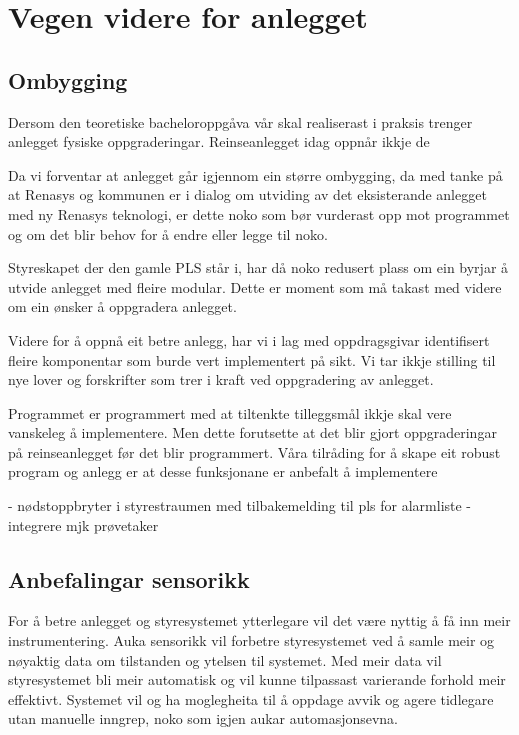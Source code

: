 \section{Vegen videre for anlegget}
\thispagestyle{fancy}

\subsection{Ombygging}

Dersom den teoretiske bacheloroppgåva vår skal realiserast i praksis trenger anlegget fysiske oppgraderingar.
Reinseanlegget idag oppnår ikkje de




Da vi forventar at anlegget går igjennom ein større ombygging, da med tanke på at Renasys og kommunen er i dialog om utviding 
av det eksisterande anlegget med ny Renasys teknologi, er dette noko som bør vurderast opp mot programmet 
og om det blir behov for å endre eller legge til noko. 

Styreskapet der den gamle PLS står i, har då noko redusert plass om ein byrjar å utvide anlegget med fleire modular. 
Dette er moment som må takast med videre om ein ønsker å oppgradera anlegget.

Videre for å oppnå eit betre anlegg, har vi i lag med oppdragsgivar identifisert fleire komponentar som burde 
vert implementert på sikt. Vi tar ikkje stilling til nye lover og forskrifter som trer i kraft ved oppgradering av anlegget.

Programmet er programmert med at tiltenkte tilleggsmål ikkje skal vere vanskeleg å implementere. 
Men dette forutsette at det blir gjort oppgraderingar på reinseanlegget før det blir programmert. 
Våra tilråding for å skape eit robust program og anlegg er at desse funksjonane er anbefalt å implementere

- nødstoppbryter i styrestraumen med tilbakemelding til pls for alarmliste
- integrere mjk prøvetaker

\newpage

\subsection{Anbefalingar sensorikk}

For å betre anlegget og styresystemet ytterlegare vil det være nyttig å få inn meir instrumentering. 
Auka sensorikk vil forbetre styresystemet ved å samle meir og nøyaktig data om tilstanden og ytelsen til systemet. 
Med meir data vil styresystemet bli meir automatisk og vil kunne tilpassast varierande forhold meir effektivt. 
Systemet vil og ha moglegheita til å oppdage avvik og agere tidlegare utan manuelle inngrep, noko som igjen aukar automasjonsevna.

